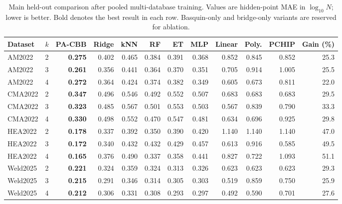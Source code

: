 \begin{table}[!t]
\caption{Main held-out comparison after pooled multi-database training. Values are hidden-point MAE in $\log_{10}N$; lower is better. Bold denotes the best result in each row. Basquin-only and bridge-only variants are reserved for ablation.}
\label{tab:five_dataset_main}
\centering\scriptsize\setlength{\tabcolsep}{2.8pt}
\begin{tabular}{llrrrrrrrrrr}
\toprule
Dataset & $k$ & PA-CBB & Ridge & kNN & RF & ET & MLP & Linear & Poly. & PCHIP & Gain (\%) \\
\midrule
AM2022 & 2 & \textbf{0.275} & 0.402 & 0.465 & 0.384 & 0.391 & 0.368 & 0.852 & 0.845 & 0.852 & 25.3 \\
AM2022 & 3 & \textbf{0.261} & 0.356 & 0.441 & 0.364 & 0.370 & 0.351 & 0.705 & 0.914 & 1.005 & 25.5 \\
AM2022 & 4 & \textbf{0.272} & 0.364 & 0.424 & 0.374 & 0.382 & 0.349 & 0.605 & 0.673 & 0.811 & 22.0 \\
CMA2022 & 2 & \textbf{0.347} & 0.496 & 0.546 & 0.492 & 0.552 & 0.507 & 0.683 & 0.683 & 0.683 & 29.5 \\
CMA2022 & 3 & \textbf{0.323} & 0.485 & 0.567 & 0.501 & 0.553 & 0.503 & 0.567 & 0.839 & 0.790 & 33.3 \\
CMA2022 & 4 & \textbf{0.330} & 0.498 & 0.552 & 0.470 & 0.547 & 0.481 & 0.634 & 0.696 & 0.925 & 29.8 \\
HEA2022 & 2 & \textbf{0.178} & 0.337 & 0.392 & 0.350 & 0.390 & 0.420 & 1.140 & 1.140 & 1.140 & 47.0 \\
HEA2022 & 3 & \textbf{0.172} & 0.340 & 0.432 & 0.432 & 0.429 & 0.457 & 0.613 & 0.916 & 0.585 & 49.5 \\
HEA2022 & 4 & \textbf{0.165} & 0.376 & 0.490 & 0.337 & 0.358 & 0.441 & 0.827 & 0.722 & 1.093 & 51.1 \\
Weld2025 & 2 & \textbf{0.221} & 0.324 & 0.359 & 0.324 & 0.313 & 0.326 & 0.623 & 0.623 & 0.623 & 29.3 \\
Weld2025 & 3 & \textbf{0.215} & 0.291 & 0.346 & 0.314 & 0.305 & 0.303 & 0.519 & 0.859 & 0.750 & 25.9 \\
Weld2025 & 4 & \textbf{0.212} & 0.306 & 0.331 & 0.308 & 0.293 & 0.297 & 0.492 & 0.590 & 0.701 & 27.6 \\
\bottomrule
\end{tabular}
\end{table}